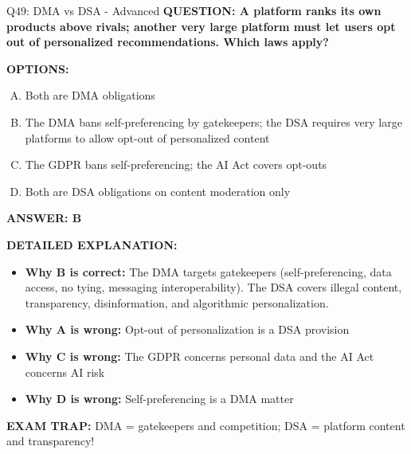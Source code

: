 \documentclass[8pt]{beamer}
\begin{document}
\begin{frame}[shrink=6]{Q49: DMA vs DSA - Advanced}
\fontsize{6.5}{7.5}\selectfont
\textbf{QUESTION: A platform ranks its own products above rivals; another very large platform must let users opt out of personalized recommendations. Which laws apply?}

\vspace{0.1cm}
\textbf{OPTIONS:}
\begin{enumerate}[A.]
\item Both are DMA obligations
\item The DMA bans self-preferencing by gatekeepers; the DSA requires very large platforms to allow opt-out of personalized content
\item The GDPR bans self-preferencing; the AI Act covers opt-outs
\item Both are DSA obligations on content moderation only
\end{enumerate}

\vspace{0.1cm}
\textcolor{myblue}{\textbf{ANSWER: B}}

\vspace{0.1cm}
\textbf{DETAILED EXPLANATION:}
\begin{itemize}
\item \textbf{Why B is correct:} The DMA targets gatekeepers (self-preferencing, data access, no tying, messaging interoperability). The DSA covers illegal content, transparency, disinformation, and algorithmic personalization.
\item \textbf{Why A is wrong:} Opt-out of personalization is a DSA provision
\item \textbf{Why C is wrong:} The GDPR concerns personal data and the AI Act concerns AI risk
\item \textbf{Why D is wrong:} Self-preferencing is a DMA matter
\end{itemize}

\textcolor{myred}{\textbf{EXAM TRAP:}} DMA = gatekeepers and competition; DSA = platform content and transparency!
\end{frame}
\end{document}
